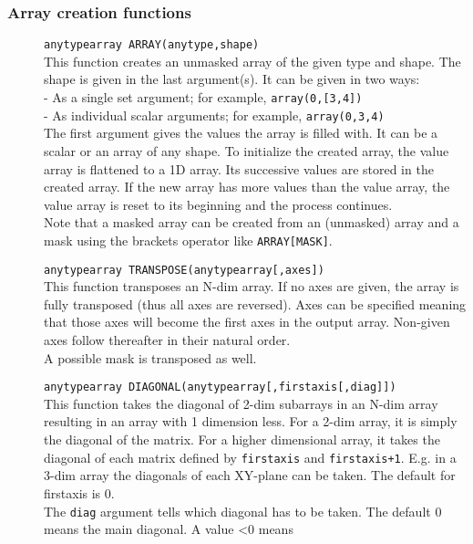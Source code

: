 \subsubsection{Array creation functions}
\begin{description}
  \item[] \texttt{anytypearray ARRAY(anytype,shape)}\\
    This function creates an unmasked array of the given type and shape.
    The shape is given in the last argument(s).
    It can be given in two ways:
    \\- As a single set argument; for example, \texttt{array(0,[3,4])}
    \\- As individual scalar arguments; for example, \texttt{array(0,3,4)}
    \\The first argument gives the values the array is filled with.
    It can be a scalar or an array of any shape. To initialize the
    created array, the value array is flattened to a 1D array.
    Its successive values are stored in the created array. If the
    new array has more values than the value array, the value array is
    reset to its beginning and the process continues.
    \\Note that a masked array can be created from an (unmasked) array and a mask
    using the brackets operator like \texttt{ARRAY[MASK]}.
  \item[] \texttt{anytypearray TRANSPOSE(anytypearray[,axes])}\\
    This function transposes an N-dim array. If no axes
    are given, the array is fully transposed (thus all axes are
    reversed). Axes can be specified meaning that those axes will become the
    first axes in the output array. Non-given axes follow thereafter
    in their natural order.
    \\A possible mask is transposed as well.
  \item[] \texttt{anytypearray DIAGONAL(anytypearray[,firstaxis[,diag]])}\\
    This function takes the diagonal of 2-dim subarrays in an N-dim array resulting in
    an array with 1 dimension less. For a 2-dim array, it is simply the
    diagonal of the matrix. For a higher dimensional array, it takes
    the diagonal of each matrix defined by \texttt{firstaxis} and
    \texttt{firstaxis+1}. E.g. in a 3-dim array the
    diagonals of each XY-plane can be taken. The default for firstaxis
    is 0.
    \\The \texttt{diag} argument tells which diagonal has to be
    taken. The default 0 means the main diagonal. A value <0 means

\end{description}

